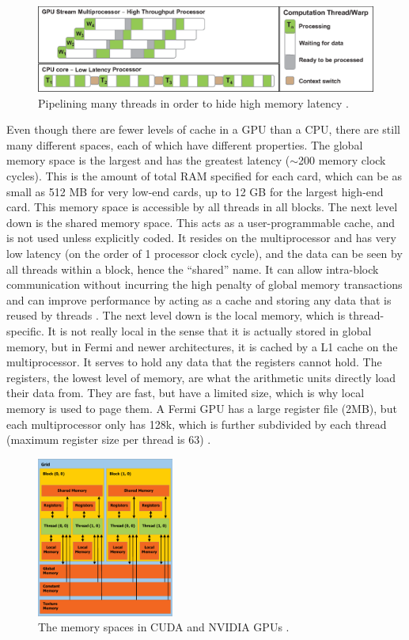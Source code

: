 \begin{figure}[h!] 
  \centering
    \includegraphics[width=\textwidth]{graphics/pipeline.eps}
     \caption{Pipelining many threads in order to hide high memory latency \cite{cuda_gtc_pres}. \label{pipeline}}
\end{figure}

Even though there are fewer levels of cache in a GPU than a CPU, there are still many different spaces, each of which have different properties.  The global memory space is the largest and has the greatest latency ($\sim$200 memory clock cycles).  This is the amount of total RAM specified for each card, which can be as small as 512 MB for very low-end cards, up to 12 GB for the largest high-end card.  This memory space is accessible by all threads in all blocks.  The next level down is the shared memory space.  This acts as a user-programmable cache, and is not used unless explicitly coded.  It resides on the multiprocessor and has very low latency (on the order of 1 processor clock cycle), and the data can be seen by all threads within a block, hence the ``shared'' name.  It can allow intra-block communication  without incurring the high penalty of global memory transactions and can improve performance by acting as a cache and storing any data that is reused by threads \cite{cuda}.  The next level down is the local memory, which is thread-specific.  It is not really local in the sense that it is actually stored in global memory, but in Fermi and newer architectures, it is cached by a  L1 cache on the multiprocessor.  It serves to hold any data that the registers cannot hold.  The registers, the lowest level of memory, are what the arithmetic units directly load their data from.  They are fast, but have a limited size, which is why local memory is used to page them.  A Fermi GPU  has a large register file (2MB), but each multiprocessor only has 128k, which is further subdivided by each thread (maximum register size per thread is 63) \cite{fermi}.

\begin{figure}[h!] 
  \centering
    \includegraphics[width=0.4\textwidth]{graphics/CUDA_memory.eps}
     \caption{The memory spaces in CUDA and NVIDIA GPUs \cite{cuda}. \label{cuda_mem}}
\end{figure}

